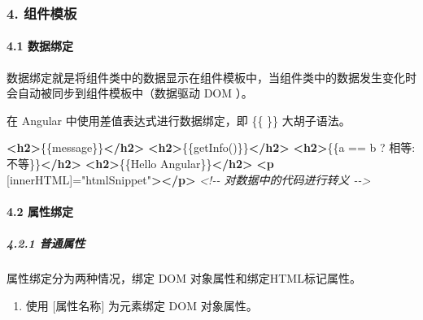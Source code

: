 \documentclass[
]{article}
\newenvironment{Shaded}{}{}
\newcommand{\CommentTok}[1]{\textcolor[rgb]{0.38,0.63,0.69}{\textit{#1}}}
\newcommand{\KeywordTok}[1]{\textcolor[rgb]{0.00,0.44,0.13}{\textbf{#1}}}
\newcommand{\NormalTok}[1]{#1}
\newcommand{\OtherTok}[1]{\textcolor[rgb]{0.00,0.44,0.13}{#1}}
\newcommand{\StringTok}[1]{\textcolor[rgb]{0.25,0.44,0.63}{#1}}
\begin{document}
\hypertarget{4-ux7ec4ux4ef6ux6a21ux677f}{%
\subsubsection{4. 组件模板}\label{4-ux7ec4ux4ef6ux6a21ux677f}}

\hypertarget{41-ux6570ux636eux7ed1ux5b9a}{%
\paragraph{4.1 数据绑定}\label{41-ux6570ux636eux7ed1ux5b9a}}

数据绑定就是将组件类中的数据显示在组件模板中，当组件类中的数据发生变化时会自动被同步到组件模板中（数据驱动
DOM ）。

在 Angular 中使用差值表达式进行数据绑定，即 \{\{ \}\} 大胡子语法。

\begin{Shaded}
\begin{Highlighting}[]
\KeywordTok{\textless{}h2\textgreater{}}\NormalTok{\{\{message\}\}}\KeywordTok{\textless{}/h2\textgreater{}}
\KeywordTok{\textless{}h2\textgreater{}}\NormalTok{\{\{getInfo()\}\}}\KeywordTok{\textless{}/h2\textgreater{}}
\KeywordTok{\textless{}h2\textgreater{}}\NormalTok{\{\{a == b ? \textquotesingle{}相等\textquotesingle{}: \textquotesingle{}不等\textquotesingle{}\}\}}\KeywordTok{\textless{}/h2\textgreater{}}
\KeywordTok{\textless{}h2\textgreater{}}\NormalTok{\{\{\textquotesingle{}Hello Angular\textquotesingle{}\}\}}\KeywordTok{\textless{}/h2\textgreater{}}
\KeywordTok{\textless{}p}\OtherTok{ [innerHTML]=}\StringTok{"htmlSnippet"}\KeywordTok{\textgreater{}\textless{}/p\textgreater{}} \CommentTok{\textless{}!{-}{-} 对数据中的代码进行转义 {-}{-}\textgreater{}}
\end{Highlighting}
\end{Shaded}

\hypertarget{42-ux5c5eux6027ux7ed1ux5b9a}{%
\paragraph{4.2 属性绑定}\label{42-ux5c5eux6027ux7ed1ux5b9a}}

\hypertarget{421-ux666eux901aux5c5eux6027}{%
\subparagraph{4.2.1 普通属性}\label{421-ux666eux901aux5c5eux6027}}

属性绑定分为两种情况，绑定 DOM 对象属性和绑定HTML标记属性。

\begin{enumerate}
\def\labelenumi{\arabic{enumi}.}
\item
  使用 {[}属性名称{]} 为元素绑定 DOM 对象属性。
\end{enumerate}
\end{document}
